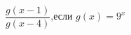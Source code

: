 \begin{ex}[type=calculate_expression]
	\begin{condition}
		\( \dfrac{g(x-1)}{g(x-4)} \),\quad если \( g(x)=9^x \)
	\end{condition}
\end{ex}